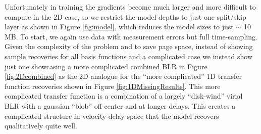\documentclass[floatfix,twocolumn,trackchanges,linenumbers]{aastex7}
\begin{document}
Unfortunately in training the gradients become much larger and more difficult to compute in the 2D case, so we restrict the model depths to just one split/skip layer as shown in Figure \ref{fig:model}, which reduces the model sizes to just $\sim$ 10 MB. To start, we again use data with measurement errors but full time-sampling. Given the complexity of the problem and to save page space, instead of showing sample recoveries for all basis functions and a complicated case we instead show just one showcasing a more complicated combined BLR in Figure \ref{fig:2Dcombined} as the 2D analogue for the ``more complicated'' 1D transfer function recoveries shown in Figure \ref{fig:1DMissingResults}. This more complicated transfer function is a combination of a largely ``disk-wind'' virial BLR with a gaussian ``blob'' off-center and at longer delays. This creates a complicated structure in velocity-delay space that the model recovers qualitatively quite well. 
\end{document}
